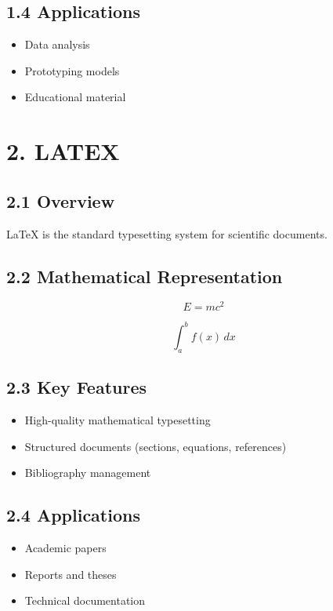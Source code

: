 \subsection*{1.4 Applications}

\begin{itemize}
\item Data analysis
\item Prototyping models
\item Educational material
\end{itemize}

\vspace{0.5cm}

\section*{2. LATEX}

\subsection*{2.1 Overview}

LaTeX is the standard typesetting system for scientific documents.

\subsection*{2.2 Mathematical Representation}

\[
E = mc^2
\]

\[
\int_a^b f(x)\,dx
\]

\subsection*{2.3 Key Features}

\begin{itemize}
\item High-quality mathematical typesetting
\item Structured documents (sections, equations, references)
\item Bibliography management
\end{itemize}

\subsection*{2.4 Applications}

\begin{itemize}
\item Academic papers
\item Reports and theses
\item Technical documentation
\end{itemize}

